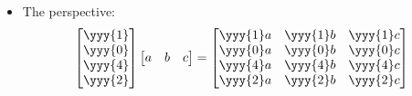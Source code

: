 \begin{itemize}
\begin{itemize}
\begin{itemize}
      \item The  perspective:
      \[%
      \begin{bmatrix}
        \yyy{1} \\
        \yyy{0} \\
        \yyy{4} \\
        \yyy{2}
      \end{bmatrix} \begin{bmatrix} a & b & c \end{bmatrix}
      =
      \begin{bmatrix}
        \yyy{1}a & \yyy{1}b & \yyy{1}c \\
        \yyy{0}a & \yyy{0}b & \yyy{0}c \\
        \yyy{4}a & \yyy{4}b & \yyy{4}c \\
        \yyy{2}a & \yyy{2}b & \yyy{2}c  
      \end{bmatrix}
      \]%
    \end{itemize}
  \end{itemize}
  

\end{itemize}
